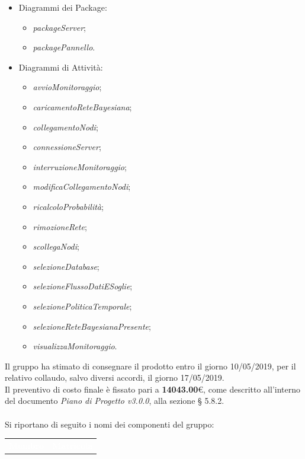 \documentclass[11pt, a4paper]{letter} %
\begin{document}
\begin{letter}
\begin{itemize}
\begin{itemize}
			\end{itemize}
		\item Diagrammi dei Package:
			\begin{itemize}
				\item \textit{packageServer};
				\item \textit{packagePannello}.
			\end{itemize}
		\item Diagrammi di Attività: 
		\begin{itemize}
			\item \textit{avvioMonitoraggio};
			\item \textit{caricamentoReteBayesiana};
			\item \textit{collegamentoNodi};
			\item \textit{connessioneServer};
			\item \textit{interruzioneMonitoraggio};
			\item \textit{modificaCollegamentoNodi};
			\item \textit{ricalcoloProbabilità};
			\item \textit{rimozioneRete};
			\item \textit{scollegaNodi};
			\item \textit{selezioneDatabase};
			\item \textit{selezioneFlussoDatiESoglie};
			\item \textit{selezionePoliticaTemporale};
			\item \textit{selezioneReteBayesianaPresente};
			\item \textit{visualizzaMonitoraggio}.
		\end{itemize}
		\end{itemize}
		Il gruppo ha stimato di consegnare il prodotto entro il giorno 10/05/2019, per il relativo collaudo, salvo diversi accordi, il giorno 17/05/2019.\\  
		Il preventivo di costo finale è fissato pari a \textbf{14043.00}€, come descritto all'interno del documento \textit{Piano di Progetto v3.0.0}, alla sezione § 5.8.2.\\ %
		\-\\
		Si riportano di seguito i nomi dei componenti del gruppo:
		\begin{center}
			\begin{longtable}[c]{|m{}|m{}|} 
				\hline
				\rowcolor{bluelogo}\textbf{\textcolor{white}{Membro}}  & \textbf{\textcolor{white}{Matricola}}\\

\end{longtable}
\end{center}
\end{letter}
\end{document}
